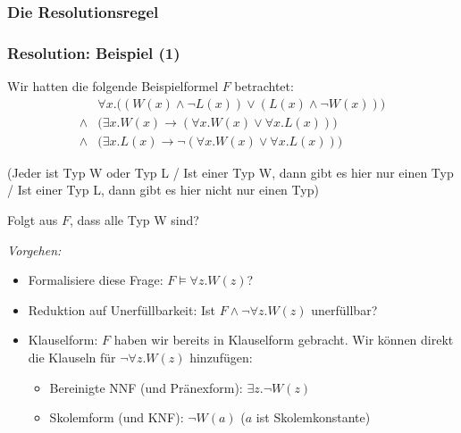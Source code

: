 \documentclass[aspectratio=1610,onlymath]{beamer}
\begin{document}
\begin{frame}\frametitle{Die Resolutionsregel}

\medskip\pause


\end{frame}

\begin{frame}\frametitle{Resolution: Beispiel (1)}
 
 Wir hatten die folgende Beispielformel $F$ betrachtet:
%  
 \begin{align*}
& \forall x.\big((W(x)\wedge\neg L(x))\vee (L(x)\wedge\neg W(x))\big) \\
{}\wedge{} & \big(\exists x.W(x)\to(\forall x.W(x) \vee \forall x.L(x))\big) \\
{}\wedge{} & \big(\exists x.L(x)\to\neg(\forall x.W(x) \vee \forall x.L(x))\big)
\end{align*}

(Jeder ist Typ W oder Typ L / Ist einer Typ W, dann gibt es hier nur einen Typ / Ist einer Typ L, dann gibt es hier nicht nur einen Typ)\medskip

\alert{Folgt aus $F$, dass alle Typ W sind?}\bigskip\pause

\emph{Vorgehen:}
\begin{itemize}
\item Formalisiere diese Frage: \alert{$F\models \forall z.W(z)$?}\pause
\item Reduktion auf Unerfüllbarkeit: \alert{Ist $F\wedge\neg\forall z.W(z)$ unerfüllbar?}\pause
\item Klauselform: $F$ haben wir bereits in Klauselform gebracht. Wir können direkt die \alert{Klauseln für $\neg\forall z.W(z)$} hinzufügen:
\begin{itemize}
\item Bereinigte NNF (und Pränexform): \alert{$\exists z.\neg W(z)$}
\item Skolemform (und KNF): \alert{$\neg W(a)$} ($a$ ist Skolemkonstante)
\end{itemize}
\end{itemize}

\end{frame}
\end{document}
